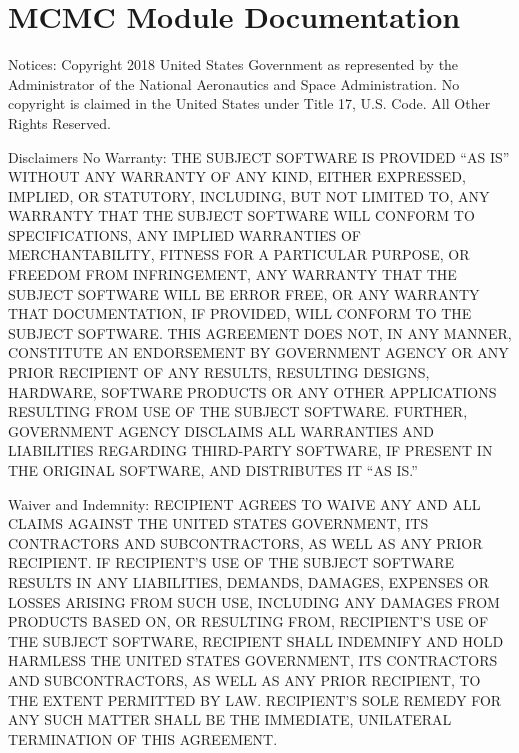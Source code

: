 \documentclass[letterpaper,10pt,english]{sphinxmanual}
\begin{document}
\section{MCMC Module Documentation}
\label{\detokenize{source_code:module-smcpy.mcmc.mcmc_sampler}}\label{\detokenize{source_code:mcmc-module-documentation}}
Notices:
Copyright 2018 United States Government as represented by the Administrator of
the National Aeronautics and Space Administration. No copyright is claimed in
the United States under Title 17, U.S. Code. All Other Rights Reserved.

Disclaimers
No Warranty: THE SUBJECT SOFTWARE IS PROVIDED “AS IS” WITHOUT ANY WARRANTY OF
ANY KIND, EITHER EXPRESSED, IMPLIED, OR STATUTORY, INCLUDING, BUT NOT LIMITED
TO, ANY WARRANTY THAT THE SUBJECT SOFTWARE WILL CONFORM TO SPECIFICATIONS, ANY
IMPLIED WARRANTIES OF MERCHANTABILITY, FITNESS FOR A PARTICULAR PURPOSE, OR
FREEDOM FROM INFRINGEMENT, ANY WARRANTY THAT THE SUBJECT SOFTWARE WILL BE ERROR
FREE, OR ANY WARRANTY THAT DOCUMENTATION, IF PROVIDED, WILL CONFORM TO THE
SUBJECT SOFTWARE. THIS AGREEMENT DOES NOT, IN ANY MANNER, CONSTITUTE AN
ENDORSEMENT BY GOVERNMENT AGENCY OR ANY PRIOR RECIPIENT OF ANY RESULTS,
RESULTING DESIGNS, HARDWARE, SOFTWARE PRODUCTS OR ANY OTHER APPLICATIONS
RESULTING FROM USE OF THE SUBJECT SOFTWARE.  FURTHER, GOVERNMENT AGENCY
DISCLAIMS ALL WARRANTIES AND LIABILITIES REGARDING THIRD-PARTY SOFTWARE, IF
PRESENT IN THE ORIGINAL SOFTWARE, AND DISTRIBUTES IT “AS IS.”

Waiver and Indemnity:  RECIPIENT AGREES TO WAIVE ANY AND ALL CLAIMS AGAINST THE
UNITED STATES GOVERNMENT, ITS CONTRACTORS AND SUBCONTRACTORS, AS WELL AS ANY
PRIOR RECIPIENT.  IF RECIPIENT’S USE OF THE SUBJECT SOFTWARE RESULTS IN ANY
LIABILITIES, DEMANDS, DAMAGES, EXPENSES OR LOSSES ARISING FROM SUCH USE,
INCLUDING ANY DAMAGES FROM PRODUCTS BASED ON, OR RESULTING FROM, RECIPIENT’S
USE OF THE SUBJECT SOFTWARE, RECIPIENT SHALL INDEMNIFY AND HOLD HARMLESS THE
UNITED STATES GOVERNMENT, ITS CONTRACTORS AND SUBCONTRACTORS, AS WELL AS ANY
PRIOR RECIPIENT, TO THE EXTENT PERMITTED BY LAW.  RECIPIENT’S SOLE REMEDY FOR
ANY SUCH MATTER SHALL BE THE IMMEDIATE, UNILATERAL TERMINATION OF THIS
AGREEMENT.
\end{document}
